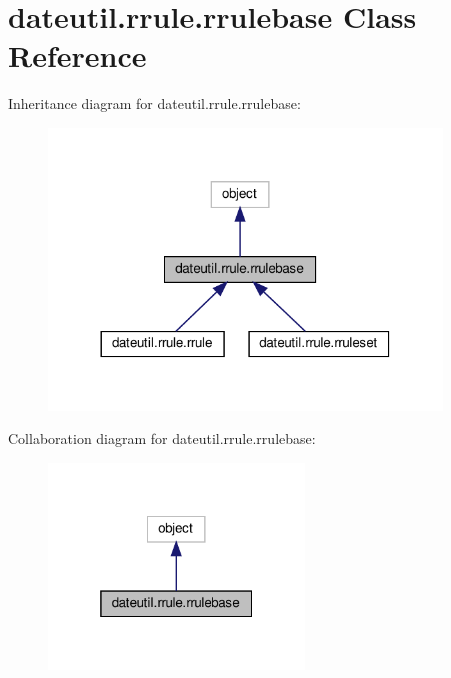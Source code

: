 \hypertarget{classdateutil_1_1rrule_1_1rrulebase}{}\section{dateutil.\+rrule.\+rrulebase Class Reference}
\label{classdateutil_1_1rrule_1_1rrulebase}


Inheritance diagram for dateutil.\+rrule.\+rrulebase\+:
\nopagebreak
\begin{figure}[H]
\begin{center}
\leavevmode
\includegraphics[width=296pt]{classdateutil_1_1rrule_1_1rrulebase__inherit__graph}
\end{center}
\end{figure}


Collaboration diagram for dateutil.\+rrule.\+rrulebase\+:
\nopagebreak
\begin{figure}[H]
\begin{center}
\leavevmode
\includegraphics[width=193pt]{classdateutil_1_1rrule_1_1rrulebase__coll__graph}
\end{center}
\end{figure}
